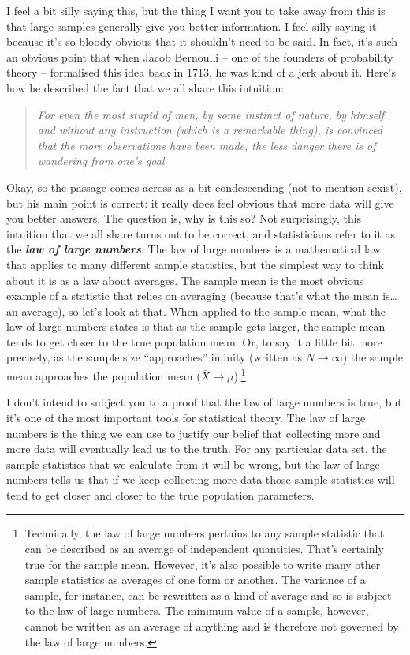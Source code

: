 \documentclass[
]{book}
\begin{document}
I feel a bit silly saying this, but the thing I want you to take away from this is that large samples generally give you better information. I feel silly saying it because it's so bloody obvious that it shouldn't need to be said. In fact, it's such an obvious point that when Jacob Bernoulli -- one of the founders of probability theory -- formalised this idea back in 1713, he was kind of a jerk about it. Here's how he described the fact that we all share this intuition:

\begin{quote}
\emph{For even the most stupid of men, by some instinct of nature, by himself and without any instruction (which is a remarkable thing), is convinced that the more observations have been made, the less danger there is of wandering from one's goal} \citet{Stigler1986}
\end{quote}

Okay, so the passage comes across as a bit condescending (not to mention sexist), but his main point is correct: it really does feel obvious that more data will give you better answers. The question is, why is this so? Not surprisingly, this intuition that we all share turns out to be correct, and statisticians refer to it as the \textbf{\emph{law of large numbers}}. The law of large numbers is a mathematical law that applies to many different sample statistics, but the simplest way to think about it is as a law about averages. The sample mean is the most obvious example of a statistic that relies on averaging (because that's what the mean is\ldots{} an average), so let's look at that. When applied to the sample mean, what the law of large numbers states is that as the sample gets larger, the sample mean tends to get closer to the true population mean. Or, to say it a little bit more precisely, as the sample size ``approaches'' infinity (written as \(N \rightarrow \infty\)) the sample mean approaches the population mean (\(\bar{X} \rightarrow \mu\)).\footnote{Technically, the law of large numbers pertains to any sample statistic that can be described as an average of independent quantities. That's certainly true for the sample mean. However, it's also possible to write many other sample statistics as averages of one form or another. The variance of a sample, for instance, can be rewritten as a kind of average and so is subject to the law of large numbers. The minimum value of a sample, however, cannot be written as an average of anything and is therefore not governed by the law of large numbers.}

I don't intend to subject you to a proof that the law of large numbers is true, but it's one of the most important tools for statistical theory. The law of large numbers is the thing we can use to justify our belief that collecting more and more data will eventually lead us to the truth. For any particular data set, the sample statistics that we calculate from it will be wrong, but the law of large numbers tells us that if we keep collecting more data those sample statistics will tend to get closer and closer to the true population parameters.
\end{document}
